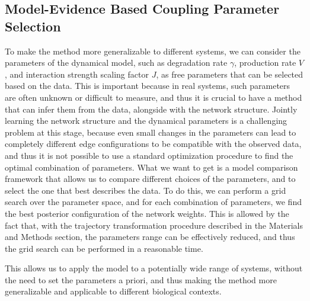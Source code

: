 \documentclass[10pt, aps, rmp,  twocolumn, superscriptaddress, floatfix, showkeys]{revtex4-2}
\begin{document}
\subsection{Model-Evidence Based Coupling Parameter Selection}

To make the method more generalizable to different systems, we can consider the parameters of the dynamical model, such as degradation rate $\gamma$, production rate $V$, and interaction strength scaling factor $J$, as free parameters that can be selected based on the data. This is important because in real systems, such parameters are often unknown or difficult to measure, and thus it is crucial to have a method that can infer them from the data, alongside with the network structure.
Jointly learning the network structure and the dynamical parameters is a challenging problem at this stage, because even small changes in the parameters can lead to completely different edge configurations to be compatible with the observed data, and thus it is not possible to use a standard optimization procedure to find the optimal combination of parameters.
What we want to get is a model comparison framework that allows us to compare different choices of the parameters, and to select the one that best describes the data. To do this, we can perform a grid search over the parameter space, and for each combination of parameters, we find the best posterior configuration of the network weights. This is allowed by the fact that, with the trajectory transformation procedure described in the Materials and Methods section, the parameters range can be effectively reduced, and thus the grid search can be performed in a reasonable time.

This allows us to apply the model to a potentially wide range of systems, without the need to set the parameters a priori, and thus making the method more generalizable and applicable to different biological contexts.
\end{document}
